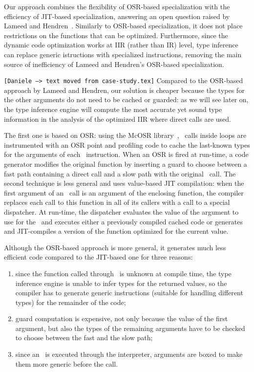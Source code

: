 \noindent Our approach combines the flexibility of OSR-based specialization with the efficiency of JIT-based specialization, answering an open question raised by Lameed and Hendren~\cite{lameed2013feval}. Similarly to OSR-based specialization, it does not place restrictions on the functions that can be optimized. Furthermore, since the dynamic code optimization works at IIR (rather than IR) level, type inference can replace generic istructions with specialized instructions, removing the main source of inefficiency of Lameed and Hendren's OSR-based specialization.

{\tt [Daniele --> text moved from case-study.tex]} Compared to the OSR-based approach by Lameed and Hendren, our solution is cheaper because the types for the other arguments do not need to be cached or guarded: as we will see later on, the type inference engine will compute the most accurate yet sound type information in the analysis of the optimized IIR where direct calls are used.

\ifdefined\fullver
The first one is based on OSR: using the McOSR library~\cite{lameed2013modular}, \feval\ calls inside loops are instrumented with an OSR point and profiling code to cache the last-known types for the arguments of each \feval\ instruction. When an OSR is fired at run-time, a code generator modifies the original function by inserting a guard to choose between a fast path containing a direct call and a slow path with the original \feval\ call. The second technique is less general and uses value-based JIT compilation: when the first argument of an \feval\ call is an argument of the enclosing function, the compiler replaces each call to this function in all of its callers with a call to a special dispatcher. At run-time, the dispatcher evaluates the value of the argument to use for the \feval\ and executes either a previously compiled cached code or generates and JIT-compiles a version of the function optimized for the current value.

Although the OSR-based approach is more general, it generates much less efficient code compared to the JIT-based one for three reasons:
\begin{enumerate}
\item since the function called through \feval\ is unknown at compile time, the type inference engine is unable to infer types for the returned values, so the compiler has to generate generic instructions (suitable for handling different types) for the remainder of the code;
\item guard computation is expensive, not only because the value of the first argument, but also the types of the remaining arguments have to be checked to choose between the fast and the slow path;
\item since an \feval\ is executed through the interpreter, arguments are boxed to make them more generic before the call.
\end{enumerate}

